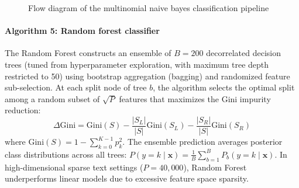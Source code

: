 \begin{figure}[htbp]
\centering
{}
\caption{Flow diagram of the multinomial naive bayes classification pipeline}\label{fig:tikz_naive_bayes}
\end{figure}

\paragraph*{Algorithm 5: Random forest classifier}
The Random Forest constructs an ensemble of $B = 200$ decorrelated decision trees (tuned from hyperparameter exploration, with maximum tree depth restricted to 50) using bootstrap aggregation (bagging) and randomized feature sub-selection. At each split node of tree $b$, the algorithm selects the optimal split among a random subset of $\sqrt{P}$ features that maximizes the Gini impurity reduction:
\begin{equation}
    \Delta \text{Gini} = \text{Gini}(S) - \frac{|S_L|}{|S|} \text{Gini}(S_L) - \frac{|S_R|}{|S|} \text{Gini}(S_R)
    \label{eq:gini}
\end{equation}
where $\text{Gini}(S) = 1 - \sum_{k=0}^{K-1} p_k^2$. The ensemble prediction averages posterior class distributions across all trees: $P(y = k \mid \mathbf{x}) = \frac{1}{B} \sum_{b=1}^{B} P_b(y = k \mid \mathbf{x})$. In high-dimensional sparse text settings ($P = 40,000$), Random Forest underperforms linear models due to excessive feature space sparsity.

